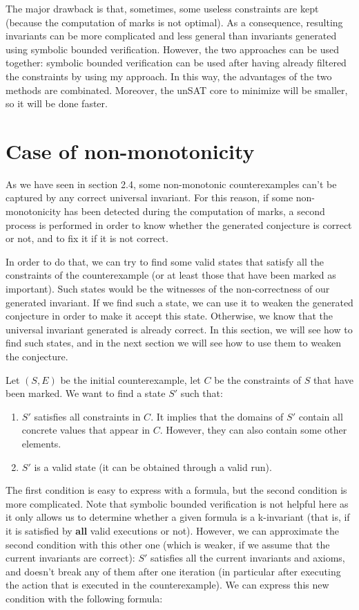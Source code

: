 \documentclass[11pt,a4paper,oldfontcommands,openany]{memoir}
\begin{document}
    The major drawback is that, sometimes, some useless constraints are kept (because the computation of marks is not optimal).
    As a consequence, resulting invariants can be more complicated and less general than invariants generated using symbolic bounded verification.
    However, the two approaches can be used together: symbolic bounded verification can be used after having already filtered the constraints by using my approach.
    In this way, the advantages of the two methods are combinated. Moreover, the unSAT core to minimize will be smaller, so it will be done faster.

    \section{Case of non-monotonicity}

    As we have seen in section 2.4, some non-monotonic counterexamples can't be captured by any correct universal invariant.
    For this reason, if some non-monotonicity has been detected during the computation of marks,
    a second process is performed in order to know whether the generated conjecture is correct or not, and to fix it if it is not correct.
    
    In order to do that, we can try to find some valid states that satisfy all the constraints of the counterexample
    (or at least those that have been marked as important). Such states would be the witnesses of the non-correctness of our generated invariant.
    If we find such a state, we can use it to weaken the generated conjecture in order to make it accept this state.
    Otherwise, we know that the universal invariant generated is already correct.
    In this section, we will see how to find such states, and in the next section we will see how to use them to weaken the conjecture.

    Let \((S,E)\) be the initial counterexample, let \(C\) be the constraints of \(S\) that have been marked.
    We want to find a state \(S'\) such that:
    \begin{enumerate}
        \item \(S'\) satisfies all constraints in \(C\). It implies that the domains of \(S'\) contain all concrete values that appear in \(C\).
        However, they can also contain some other elements.
        \item \(S'\) is a valid state (it can be obtained through a valid run).
    \end{enumerate}

    The first condition is easy to express with a formula, but the second condition is more complicated.
    Note that symbolic bounded verification is not helpful here as it only allows us to determine whether a given formula is a k-invariant (that is, if it is satisfied by \textbf{all} valid executions or not).
    However, we can approximate the second condition with this other one (which is weaker, if we assume that the current invariants are correct):
    \(S'\) satisfies all the current invariants and axioms, and doesn't break any of them after one iteration (in particular after executing the action that is executed in the counterexample).
    We can express this new condition with the following formula:
\end{document}
